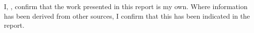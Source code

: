 I, \theauthor, confirm that the work presented in this report is my own.
Where information has been derived from other sources, I confirm that this has been indicated in the report.
